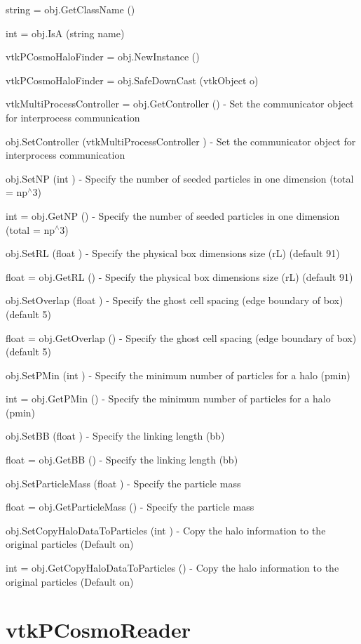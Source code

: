 \begin{DoxyItemize}
\item {\ttfamily string = obj.\-Get\-Class\-Name ()}  
\item {\ttfamily int = obj.\-Is\-A (string name)}  
\item {\ttfamily vtk\-P\-Cosmo\-Halo\-Finder = obj.\-New\-Instance ()}  
\item {\ttfamily vtk\-P\-Cosmo\-Halo\-Finder = obj.\-Safe\-Down\-Cast (vtk\-Object o)}  
\item {\ttfamily vtk\-Multi\-Process\-Controller = obj.\-Get\-Controller ()} -\/ Set the communicator object for interprocess communication  
\item {\ttfamily obj.\-Set\-Controller (vtk\-Multi\-Process\-Controller )} -\/ Set the communicator object for interprocess communication  
\item {\ttfamily obj.\-Set\-N\-P (int )} -\/ Specify the number of seeded particles in one dimension (total = np$^\wedge$3)  
\item {\ttfamily int = obj.\-Get\-N\-P ()} -\/ Specify the number of seeded particles in one dimension (total = np$^\wedge$3)  
\item {\ttfamily obj.\-Set\-R\-L (float )} -\/ Specify the physical box dimensions size (r\-L) (default 91)  
\item {\ttfamily float = obj.\-Get\-R\-L ()} -\/ Specify the physical box dimensions size (r\-L) (default 91)  
\item {\ttfamily obj.\-Set\-Overlap (float )} -\/ Specify the ghost cell spacing (edge boundary of box) (default 5)  
\item {\ttfamily float = obj.\-Get\-Overlap ()} -\/ Specify the ghost cell spacing (edge boundary of box) (default 5)  
\item {\ttfamily obj.\-Set\-P\-Min (int )} -\/ Specify the minimum number of particles for a halo (pmin)  
\item {\ttfamily int = obj.\-Get\-P\-Min ()} -\/ Specify the minimum number of particles for a halo (pmin)  
\item {\ttfamily obj.\-Set\-B\-B (float )} -\/ Specify the linking length (bb)  
\item {\ttfamily float = obj.\-Get\-B\-B ()} -\/ Specify the linking length (bb)  
\item {\ttfamily obj.\-Set\-Particle\-Mass (float )} -\/ Specify the particle mass  
\item {\ttfamily float = obj.\-Get\-Particle\-Mass ()} -\/ Specify the particle mass  
\item {\ttfamily obj.\-Set\-Copy\-Halo\-Data\-To\-Particles (int )} -\/ Copy the halo information to the original particles (Default on)  
\item {\ttfamily int = obj.\-Get\-Copy\-Halo\-Data\-To\-Particles ()} -\/ Copy the halo information to the original particles (Default on)  
\end{DoxyItemize}\hypertarget{vtkparallel_vtkpcosmoreader}{}\section{vtk\-P\-Cosmo\-Reader}\label{vtkparallel_vtkpcosmoreader}
